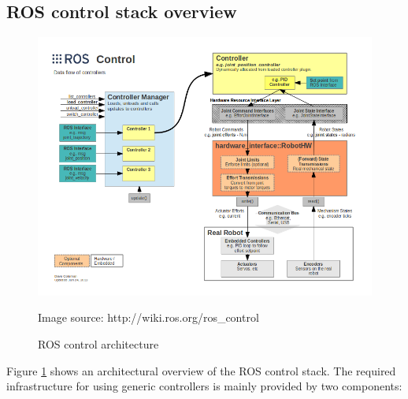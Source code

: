 \subsection{ROS control stack overview}

\begin{figure}
	\centering
  	\includegraphics[width=1.0\textwidth]{images/ros_control.png}
	\caption{ROS control architecture}
	{\scriptsize Image source: http://wiki.ros.org/ros\_control}
	\label{fig:ros_control}
\end{figure}
Figure \ref{fig:ros_control} shows an architectural overview of the ROS control stack. The required infrastructure for using generic controllers is mainly provided by two components:

